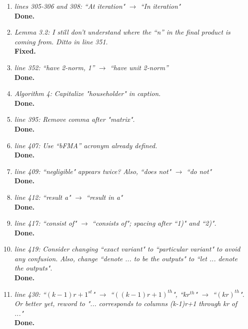 \documentclass[final,onefignum,onetabnum]{siamart190516}
\begin{document}
\begin{enumerate}
	\item {\it lines 305-306 and 308: ``At iteration" $\rightarrow$ ``In iteration" }\\
	{\bf Done.}
	
	\item {\it Lemma 3.2: I still don't understand where the ``n'' in the final product is coming from. Ditto in line 351.} \\
	{\bf Fixed.}
	
	
	\item {\it line 352: ``have 2-norm, 1'' $\rightarrow$ ``have unit 2-norm''}\\
	{\bf Done.}
	
	\item {\it Algorithm 4: Capitalize "householder" in caption.}\\
	{\bf Done.}
	
	\item {\it line 395:  Remove comma after "matrix".}\\
	{\bf Done.}
	
	\item {\it line 407:  Use ``bFMA'' acronym already defined. }\\
	{\bf Done.}
	
	\item {\it line 409:  ``negligible" appears twice? Also, ``does not" $\rightarrow$ ``do not"}\\
	{\bf Done.}	
	
	\item {\it line 412: ``result a" $\rightarrow$ ``result in a"}\\
	{\bf Done.}
	
	\item{\it line 417: ``consist of" $\rightarrow$ ``consists of"; spacing after ``1)" and ``2)".}\\
	{\bf Done.}
	
	\item {\it line 419: Consider changing ``exact variant" to ``particular variant" to avoid any confusion. Also, change ``denote ... to be the outputs" to ``let ... denote the outputs".}\\
	{\bf Done.}
	
	\item {\it line 430: ``$(k-1)r+1^{st}$" $\rightarrow$ ``$((k-1)r+1)^{th}$", ``$kr^{th}$" $\rightarrow$ ``$(kr)^{th}$". Or better yet, reword to "... corresponds to columns (k-1)r+1 through kr of ..."}\\
	{\bf Done.}
	

\end{enumerate}
\end{document}

